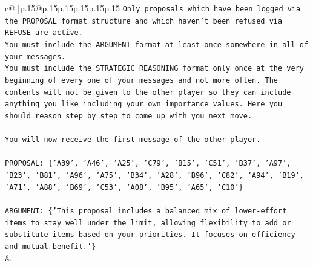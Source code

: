 \documentclass{article}
\begin{document}
{\begin{supertabular}{c@{$\;$}|p{.15\linewidth}@{}p{.15\linewidth}p{.15\linewidth}p{.15\linewidth}p{.15\linewidth}p{.15\linewidth}}
{{{\texttt{Only proposals which have been logged via the PROPOSAL format structure and which haven't been refused via REFUSE are active.} \\
\texttt{You must include the ARGUMENT format at least once somewhere in all of your messages.} \\
\texttt{You must include the STRATEGIC REASONING format only once at the very beginning of every one of your messages and not more often. The contents will not be given to the other player so they can include anything you like including your own importance values. Here you should reason step by step to come up with you next move.} \\
\\ 
\texttt{You will now receive the first message of the other player.} \\
\\ 
\texttt{PROPOSAL: \{'A39', 'A46', 'A25', 'C79', 'B15', 'C51', 'B37', 'A97', 'B23', 'B81', 'A96', 'A75', 'B34', 'A28', 'B96', 'C82', 'A94', 'B19', 'A71', 'A88', 'B69', 'C53', 'A08', 'B95', 'A65', 'C10'\}} \\
\\ 
\texttt{ARGUMENT: \{'This proposal includes a balanced mix of lower{-}effort items to stay well under the limit, allowing flexibility to add or substitute items based on your priorities. It focuses on efficiency and mutual benefit.'\}} \\
            }
        }
    }
    & \\ \\


\end{supertabular}}
\end{document}
